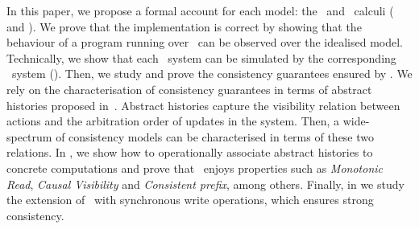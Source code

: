 In this paper, we propose a
formal account for each model: the 
\gsp\ and \igsp\ calculi ( and ). We prove
that the implementation is correct by showing that the behaviour of a program
running over \igsp\ can be  observed over the idealised model. Technically, 
we show that each \igsp\ system can be simulated by the corresponding 
\gsp\  system (). Then, we study and prove the consistency guarantees ensured by 
\gsp.  
We rely on the characterisation of consistency guarantees in terms of abstract histories proposed in~\cite{DBLP:journals/ftpl/Burckhardt14}.
Abstract histories capture the visibility relation between actions and the arbitration order of updates in the system. Then, 
a wide-spectrum of consistency models can be characterised in terms of these two relations. 
In , 
we show how to operationally associate abstract histories to concrete computations and 
prove that \gsp\ enjoys  properties  such as \textit{Monotonic Read},
 \textit{Causal Visibility}
and	{\em Consistent prefix}, among others. Finally, in  we study the  
extension of \gsp\ with synchronous write operations, which ensures strong consistency. 


